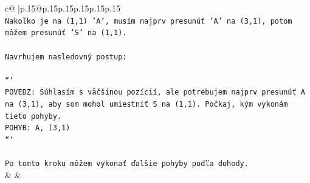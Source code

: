 \documentclass{article}
\begin{document}
{\begin{supertabular}{c@{$\;$}|p{.15\linewidth}@{}p{.15\linewidth}p{.15\linewidth}p{.15\linewidth}p{.15\linewidth}p{.15\linewidth}}
{{{\\ 
\texttt{Nakoľko je na (1,1) 'A', musím najprv presunúť 'A' na (3,1), potom môžem presunúť 'S' na (1,1).} \\
\\ 
\texttt{Navrhujem nasledovný postup:} \\
\\ 
\texttt{```} \\
\texttt{POVEDZ: Súhlasím s väčšinou pozícií, ale potrebujem najprv presunúť A na (3,1), aby som mohol umiestniť S na (1,1). Počkaj, kým vykonám tieto pohyby.} \\
\texttt{POHYB: A, (3,1)} \\
\texttt{```} \\
\\ 
\texttt{Po tomto kroku môžem vykonať ďalšie pohyby podľa dohody.} \\
            }
        }
    }
    & & \\ \\


\end{supertabular}}
\end{document}
